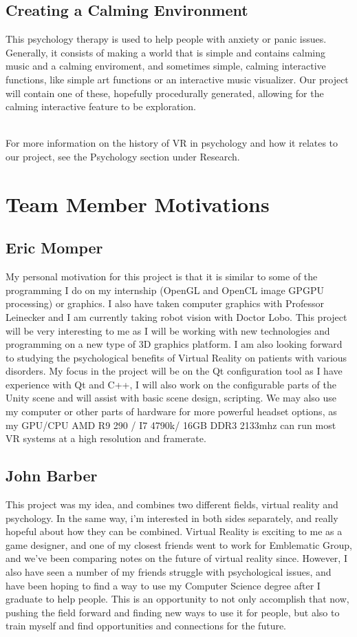 \documentclass[a4paper,10pt]{article}
\begin{document}
	\subsection{Creating a Calming Environment}
	This psychology therapy is used to help people with anxiety or panic issues.  Generally, it consists of making a world that is simple and contains calming music and a calming enviroment, and sometimes simple, calming interactive functions, like simple art functions or an interactive music visualizer.  Our project will contain one of these, hopefully procedurally generated, allowing for the calming interactive feature to be exploration.
	\par~\\ 
	For more information on the history of VR in psychology and how it relates to our project, see the Psychology section under Research.
	\pagebreak
	
	
	\section{Team Member Motivations}
	\subsection{Eric Momper}
	My personal motivation for this project is that it is similar to some of the programming I do on my internship (OpenGL and OpenCL image GPGPU processing) or graphics.
	I also have taken computer graphics with Professor Leinecker and I am currently taking robot vision with Doctor Lobo. This project will be very interesting to me as  
	I will be working with new technologies and programming on a new type of 3D graphics platform. I am also looking forward to studying the psychological benefits
	of Virtual Reality on patients with various disorders. My focus in the project will be on the Qt configuration tool as I have experience with Qt and C++, I will 
	also work on the configurable parts of the Unity scene and will assist with basic scene design, scripting. We may also use my computer or other parts of hardware for more powerful headset options, 
	as my GPU/CPU AMD R9 290 / I7 4790k/ 16GB DDR3 2133mhz can run most VR systems at a high resolution and framerate. 
	
	\subsection{John Barber}
	This project was my idea, and combines two different fields, virtual reality and psychology.  In the same way, i'm interested in both sides separately, and really hopeful about how they can be combined.  Virtual Reality is exciting to me as a game designer, 
	and one of my closest friends went to work for Emblematic Group, and we've been comparing notes on the future of virtual reality since.  However, I also have seen a number of my friends struggle with psychological issues, and have been hoping to find a way to use my Computer Science degree after I graduate to help people.  This is an opportunity to not only accomplish that now, pushing the field forward and finding new ways to use it for people, but also to train myself and find opportunities and connections for the future.
	
\end{document}
